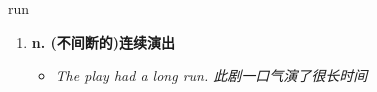 
\begin{frame}
{\huge run}
\begin{center}
\begin{enumerate}\Large
  \item \textbf{n. (不间断的)连续演出}
  \begin{itemize}
    \item \em{\Large{The play had a long run. 此剧一口气演了很长时间}}
  \end{itemize}
\end{enumerate}
\end{center}
\end{frame}
